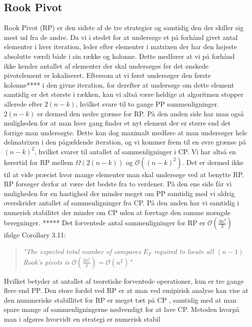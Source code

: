 \documentclass{article}
\begin{document}
\subsection{Rook Pivot}

Rook Pivot (RP) er den sidste af de tre strategier og samtidig den der skiller sig mest ud fra de andre. Da vi i stedet for at undersøge et på forhånd givet antal elementer i hver iteration, leder efter elementer i matrixen der har den højeste absolutte værdi både i sin række og kolonne. Dette medfører at vi på forhånd ikke kender antallet af elementer der skal undersøges før det ønskede pivotelement er lokaliseret. Eftersom at vi først undersøger den første kolonne**** i den givne iteration, for derefter at undersøge om dette element samtidig er det største i rækken, kan vi altså være heldige at algoritmen stopper allerede efter $2(n-k)$, hvilket svare til to gange PP sammenligninger. $2(n-k)$ er dermed den nedre grænse for RP. På den anden side har man også muligheden for at man hver gang finder et nyt element der er større end det forrige man undersøgte. Dette kan dog maximalt medføre at man undersøger hele delmatrixen i den pågældende iteration, og vi kommer frem til en øvre grænse på $(n-k)^2$, hvilket svarer til antallet af sammenligninger i CP. Vi har altså en kørertid for RP mellem $\Omega(2(n-k))$ og $\mathcal{O}((n-k)^2)$. Det er dermed ikke til at vide præcist hvor mange elementer man skal undersøge ved at benytte RP. \newline\newline
RP forsøger derfor at være det bedste fra to verdener. På den ene side får vi muligheden for en hastighed der minder meget om PP samtidig med vi aldrig overskrider antallet af sammenligninger fra CP. På den anden har vi samtidig i numerisk stabilitet der minder om CP uden at foretage den samme mængde beregninger.
\newline\newline
***** Det forventede antal sammenligninger for RP er $\mathcal{O}(\frac{3n^2}{2})$ ifølge \cite{Rook} Corollary 3.11:

\begin{quote}
\textit{"The expected total number of compares $E_T$ required to locate all $(n-1)$ Rook's pivots is\linebreak
$\mathcal{O}(\frac{3n^2}{2}) = \mathcal{O}(n^2)$"}
\end{quote}
Hvilket betyder at antallet af teoretiske forventede operationer, kun er tre gange flere end PP. Den store fordel ved RP er at man ved emipirisk analyse kan vise at den nummeriske stabillitet for RP er meget tæt på CP \cite{Rook}, samtidig med at man spare mange af sammenligningerne nødvendigt for at lave CP. Metoden hvorpå man i \cite{Rook} afgøres hvorvidt en strategi er numerisk stabil 
\end{document}
